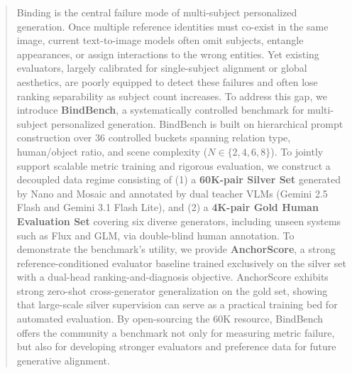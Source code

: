 \begin{abstract}
Binding is the central failure mode of multi-subject personalized generation. Once multiple reference identities must co-exist in the same image, current text-to-image models often omit subjects, entangle appearances, or assign interactions to the wrong entities. Yet existing evaluators, largely calibrated for single-subject alignment or global aesthetics, are poorly equipped to detect these failures and often lose ranking separability as subject count increases. To address this gap, we introduce \textbf{BindBench}, a systematically controlled benchmark for multi-subject personalized generation. BindBench is built on hierarchical prompt construction over 36 controlled buckets spanning relation type, human/object ratio, and scene complexity ($N \in \{2,4,6,8\}$). To jointly support scalable metric training and rigorous evaluation, we construct a decoupled data regime consisting of (1) a \textbf{60K-pair Silver Set} generated by Nano and Mosaic and annotated by dual teacher VLMs (Gemini 2.5 Flash and Gemini 3.1 Flash Lite), and (2) a \textbf{4K-pair Gold Human Evaluation Set} covering six diverse generators, including unseen systems such as Flux and GLM, via double-blind human annotation. To demonstrate the benchmark's utility, we provide \textbf{AnchorScore}, a strong reference-conditioned evaluator baseline trained exclusively on the silver set with a dual-head ranking-and-diagnosis objective. AnchorScore exhibits strong zero-shot cross-generator generalization on the gold set, showing that large-scale silver supervision can serve as a practical training bed for automated evaluation. By open-sourcing the 60K resource, BindBench offers the community a benchmark not only for measuring metric failure, but also for developing stronger evaluators and preference data for future generative alignment.
\end{abstract}
